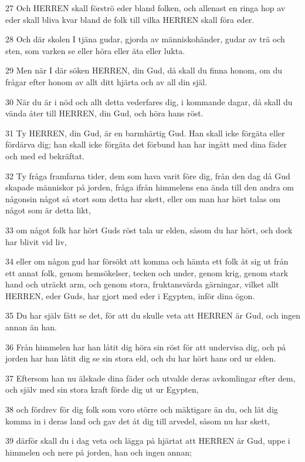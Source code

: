 \par 27 Och HERREN skall förströ eder bland folken, och allenast en ringa hop av eder skall bliva kvar bland de folk till vilka HERREN skall föra eder.
\par 28 Och där skolen I tjäna gudar, gjorda av människohänder, gudar av trä och sten, som varken se eller höra eller äta eller lukta.
\par 29 Men när I där söken HERREN, din Gud, då skall du finna honom, om du frågar efter honom av allt ditt hjärta och av all din själ.
\par 30 När du är i nöd och allt detta vederfares dig, i kommande dagar, då skall du vända åter till HERREN, din Gud, och höra hans röst.
\par 31 Ty HERREN, din Gud, är en barmhärtig Gud. Han skall icke förgäta eller fördärva dig; han skall icke förgäta det förbund han har ingått med dina fäder och med ed bekräftat.
\par 32 Ty fråga framfarna tider, dem som hava varit före dig, från den dag då Gud skapade människor på jorden, fråga ifrån himmelens ena ända till den andra om någonsin något så stort som detta har skett, eller om man har hört talas om något som är detta likt,
\par 33 om något folk har hört Guds röst tala ur elden, såsom du har hört, och dock har blivit vid liv,
\par 34 eller om någon gud har försökt att komma och hämta ett folk åt sig ut från ett annat folk, genom hemsökelser, tecken och under, genom krig, genom stark hand och uträckt arm, och genom stora, fruktansvärda gärningar, vilket allt HERREN, eder Guds, har gjort med eder i Egypten, inför dina ögon.
\par 35 Du har själv fått se det, för att du skulle veta att HERREN är Gud, och ingen annan än han.
\par 36 Från himmelen har han låtit dig höra sin röst för att undervisa dig, och på jorden har han låtit dig se sin stora eld, och du har hört hans ord ur elden.
\par 37 Eftersom han nu älskade dina fäder och utvalde deras avkomlingar efter dem, och själv med sin stora kraft förde dig ut ur Egypten,
\par 38 och fördrev för dig folk som voro större och mäktigare än du, och lät dig komma in i deras land och gav det åt dig till arvedel, såsom nu har skett,
\par 39 därför skall du i dag veta och lägga på hjärtat att HERREN är Gud, uppe i himmelen och nere på jorden, han och ingen annan;
